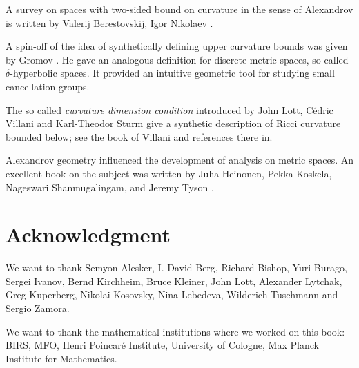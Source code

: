 A survey on spaces with two-sided bound on curvature in the sense of Alexandrov is written by Valerij Berestovskij, Igor Nikolaev \cite{berestovskii-nikolaev}.

A spin-off of the idea of synthetically defining upper curvature bounds 
was given by Gromov \cite{gromov:hyp-groups}. 
He gave an analogous definition for discrete metric spaces, so called $\delta$-hyperbolic spaces. 
It provided an intuitive geometric tool for studying small cancellation groups.

The so called \emph{curvature dimension condition} introduced by John Lott, Cédric Villani and Karl-Theodor Sturm give a synthetic description of Ricci curvature bounded below; see the book of Villani \cite{villani} and references there
in.

Alexandrov geometry influenced the development of analysis on metric spaces. 
An excellent book on the subject was written by Juha Heinonen, Pekka Koskela, Nageswari Shanmugalingam, and Jeremy Tyson \cite{HKST}.

\section*{Acknowledgment}
We want to thank 
Semyon Alesker,
I. David Berg,
Richard Bishop, 
Yuri Burago, 
Sergei Ivanov,
Bernd Kirchheim, 
Bruce Kleiner, 
John Lott,
Alexander Lytchak, 
Greg Kuperberg, 
Nikolai Kosovsky, 
Nina Lebedeva,
Wilderich Tuschmann and
Sergio Zamora.


We want to thank the mathematical institutions where we worked on this book:
BIRS, 
MFO, 
Henri Poincar\'{e} Institute,
University of Cologne, 
Max Planck Institute for Mathematics.



